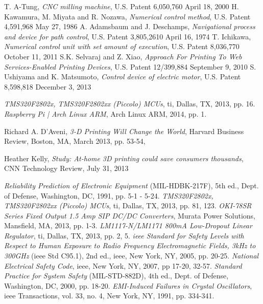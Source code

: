 \begin{thebibliography}{9}
	T. A-Tung,
	\textit{CNC milling machine},
	U.S. Patent 6,050,760 April 18, 2000
	H. Kawamura, M. Miyata and R. Nozawa,
	\textit{Numerical control method},
	U.S. Patent 4,591,968 May 27, 1986
	A. Adamsbaum and J. Deschamps,
	\textit{Navigational process and device for path control},
	U.S. Patent 3,805,2610 April 16, 1974
	T. Ichikawa,
	\textit{Numerical control unit with set amount of execution},
	U.S. Patent 8,036,770 October 11, 2011
	S.K. Selvaraj and Z. Xiao,
	\textit{Approach For Printing To Web Services-Enabled Printing Devices},
	U.S. Patent 12/399,884 September 9, 2010
	S. Ushiyama and K. Matsumoto,
	\textit{Control device of electric motor},
	U.S. Patent 8,598,818 December 3, 2013

	\textit{TMS320F2802x, TMS320F2802xx (Piccolo) MCUs},
	\gls{ti}, Dallas, TX,
	2013, pp. 16.
	\textit{Raspberry Pi | Arch Linux ARM},
	Arch Linux ARM,
	2014, pp. 1.

	Richard A. D'Aveni,
	\textit{3-D Printing Will Change the World},
	Harvard Business Review, Boston, MA,
	March 2013, pp. 53-54,

	Heather Kelly,
	\textit{Study: At-home 3D printing could save consumers thousands},
	CNN Technology Review,
	July 31, 2013

	\textit{Reliability Prediction of Electronic Equipment} (MIL-HDBK-217F), 5th ed.,
	Dept. of Defense, Washington, DC,
	1991, pp. 5-1 - 5-24.
	\textit{TMS320F2802x, TMS320F2802xx (Piccolo) MCUs},
	\gls{ti}, Dallas, TX,
	2013, pp. 81, 123.
	\textit{OKI-78SR Series Fixed Output 1.5 Amp SIP DC/DC Converters},
	Murata Power Solutions, Mansfield, MA,
	2013, pp. 1-3.
	\textit{LM1117-N/LM1171 800mA Low-Dropout Linear Regulator},
	\gls{ti}, Dallas, TX,
	2013, pp. 2, 5.
	\textit{\gls{ieee} Standard for Safety Levels with Respect to Human Exposure to Radio Frequency Electromagnetic Fields, 3kHz to 300GHz} (\gls{ieee} Std C95.1), 2nd ed.,
	\gls{ieee}, New York, NY,
	2005, pp. 20-25.
	\textit{National Electrical Safety Code},
	\gls{ieee}, New York, NY,
	2007, pp 17-20, 32-57.
	\textit{Standard Practice for System Safety} (MIL-STD-882D), 4th ed.,
	Dept. of Defense, Washington, DC,
	2000, pp. 18-20.
	\textit{EMI-Induced Failures in Crystal Oscillators},
	\gls{ieee} Transactions, vol. 33, no. 4, New York, NY,
	1991, pp. 334-341.


\end{thebibliography}
